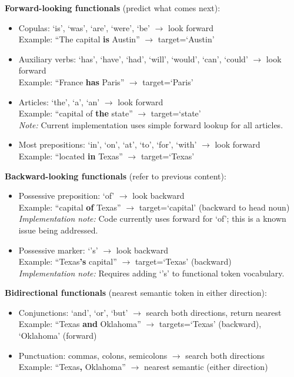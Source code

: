 \textbf{Forward-looking functionals} (predict what comes next):
\begin{itemize}
  \item Copulas: `is', `was', `are', `were', `be' $\rightarrow$ look forward\\
  Example: ``The capital \textbf{is} Austin'' $\rightarrow$ target=`Austin'
  
  \item Auxiliary verbs: `has', `have', `had', `will', `would', `can', `could' $\rightarrow$ look forward\\
  Example: ``France \textbf{has} Paris'' $\rightarrow$ target=`Paris'
  
  \item Articles: `the', `a', `an' $\rightarrow$ look forward\\
  Example: ``capital of \textbf{the} state'' $\rightarrow$ target=`state'\\
  \emph{Note:} Current implementation uses simple forward lookup for all articles.
  
  \item Most prepositions: `in', `on', `at', `to', `for', `with' $\rightarrow$ look forward\\
  Example: ``located \textbf{in} Texas'' $\rightarrow$ target=`Texas'
\end{itemize}

\textbf{Backward-looking functionals} (refer to previous content):
\begin{itemize}
  \item Possessive preposition: `of' $\rightarrow$ look backward\\
  Example: ``capital \textbf{of} Texas'' $\rightarrow$ target=`capital' (backward to head noun)\\
  \emph{Implementation note:} Code currently uses forward for `of'; this is a known issue being addressed.
  
  \item Possessive marker: `'s' $\rightarrow$ look backward\\
  Example: ``Texas\textbf{'s} capital'' $\rightarrow$ target=`Texas' (backward)\\
  \emph{Implementation note:} Requires adding `'s' to functional token vocabulary.
\end{itemize}

\textbf{Bidirectional functionals} (nearest semantic token in either direction):
\begin{itemize}
  \item Conjunctions: `and', `or', `but' $\rightarrow$ search both directions, return nearest\\
  Example: ``Texas \textbf{and} Oklahoma'' $\rightarrow$ targets=`Texas' (backward), `Oklahoma' (forward)
  
  \item Punctuation: commas, colons, semicolons $\rightarrow$ search both directions\\
  Example: ``Texas\textbf{,} Oklahoma'' $\rightarrow$ nearest semantic (either direction)
\end{itemize}

